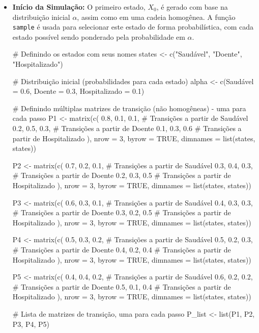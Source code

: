 \documentclass[12pt, a4paper, openany]{book}
\numberwithin{equation}{chapter}
\numberwithin{table}{chapter}
\numberwithin{figure}{chapter}
\theoremstyle{break}
\begin{document}
\begin{itemize}
\item \textbf{Início da Simulação:} O primeiro estado, \( X_0 \), é gerado com base na distribuição inicial \( \alpha \), assim como em uma cadeia homogênea. A função \texttt{sample} é usada para selecionar este estado de forma probabilística, com cada estado possível sendo ponderado pela probabilidade em \( \alpha \). 



\begin{RCodeBox}
# Definindo os estados com seus nomes
states <- c("Saudável", "Doente", "Hospitalizado")

# Distribuição inicial (probabilidades para cada estado)
alpha <- c(Saudável = 0.6, Doente = 0.3, Hospitalizado = 0.1)

# Definindo múltiplas matrizes de transição (não homogêneas) - uma para cada passo
P1 <- matrix(c(
  0.8, 0.1, 0.1,  # Transições a partir de Saudável
  0.2, 0.5, 0.3,  # Transições a partir de Doente
  0.1, 0.3, 0.6   # Transições a partir de Hospitalizado
), nrow = 3, byrow = TRUE, dimnames = list(states, states))

P2 <- matrix(c(
  0.7, 0.2, 0.1,  # Transições a partir de Saudável
  0.3, 0.4, 0.3,  # Transições a partir de Doente
  0.2, 0.3, 0.5   # Transições a partir de Hospitalizado
), nrow = 3, byrow = TRUE, dimnames = list(states, states))

P3 <- matrix(c(
  0.6, 0.3, 0.1,  # Transições a partir de Saudável
  0.4, 0.3, 0.3,  # Transições a partir de Doente
  0.3, 0.2, 0.5   # Transições a partir de Hospitalizado
), nrow = 3, byrow = TRUE, dimnames = list(states, states))

\end{RCodeBox}


\begin{RCodeBox}

P4 <- matrix(c(
  0.5, 0.3, 0.2,  # Transições a partir de Saudável
  0.5, 0.2, 0.3,  # Transições a partir de Doente
  0.4, 0.2, 0.4   # Transições a partir de Hospitalizado
), nrow = 3, byrow = TRUE, dimnames = list(states, states))

P5 <- matrix(c(
  0.4, 0.4, 0.2,  # Transições a partir de Saudável
  0.6, 0.2, 0.2,  # Transições a partir de Doente
  0.5, 0.1, 0.4   # Transições a partir de Hospitalizado
), nrow = 3, byrow = TRUE, dimnames = list(states, states))

# Lista de matrizes de transição, uma para cada passo
P_list <- list(P1, P2, P3, P4, P5)


\end{RCodeBox}
\end{itemize}
\end{document}
